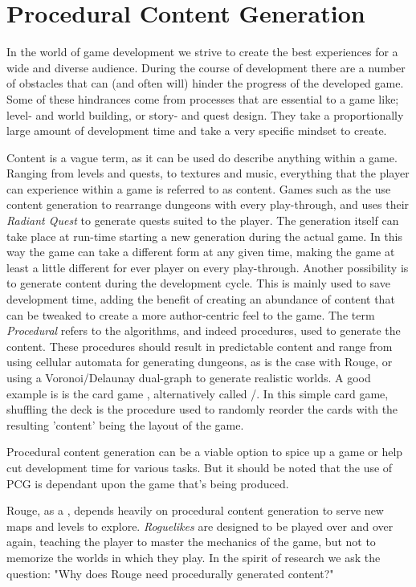 \chapter{Procedural Content Generation}
In the world of game development we strive to create the best experiences for a wide and diverse audience.
During the course of development there are a number of obstacles that can (and often will) hinder the progress of the developed game.
Some of these hindrances come from processes that are essential to a game like; level- and world building, or story- and quest design.
They take a proportionally large amount of development time and take a very specific mindset to create.

Content is a vague term, as it can be used do describe anything within a game.
Ranging from levels and quests, to textures and music, everything that the player can experience within a game is referred to as content.
Games such as the  use content generation to rearrange dungeons with every play-through, and  uses their \textit{Radiant Quest} to generate quests suited to the player.
The generation itself can take place at run-time starting a new generation during the actual game.
In this way the game can take a different form at any given time, making the game at least a little different for ever player on every play-through. 
Another possibility is to generate content during the development cycle.
This is mainly used to save development time, adding the benefit of creating an abundance of content that can be tweaked to create a more author-centric feel to the game.
The term \textit{Procedural} refers to the algorithms, and indeed procedures, used to generate the content.
These procedures should result in predictable content and range from using cellular automata for generating dungeons, as is the case with Rouge, or using a Voronoi/Delaunay dual-graph to generate realistic worlds.
A good example is is the card game , alternatively called /.
In this simple card game, shuffling the deck is the procedure used to randomly reorder the cards with the resulting 'content' being the layout of the game.

Procedural content generation can be a viable option to spice up a game or help cut development time for various tasks.
But it should be noted that the use of PCG is dependant upon the game that's being produced.

Rouge, as a \rogue, depends heavily on procedural content generation to serve new maps and levels to explore. \textit{Roguelikes} are designed to be played over and over again, teaching the player to master the mechanics of the game, but not to memorize the worlds in which they play. In the spirit of research we ask the question: "Why does Rouge need procedurally generated content?"

